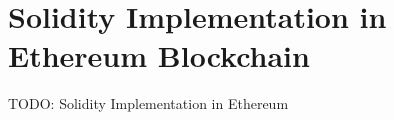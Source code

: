 \documentclass[../main.tex]{subfiles}
\begin{document}
\section{Solidity Implementation in Ethereum Blockchain}
\label{sec:solidity_implementation}
TODO: Solidity Implementation in Ethereum
\end{document}
